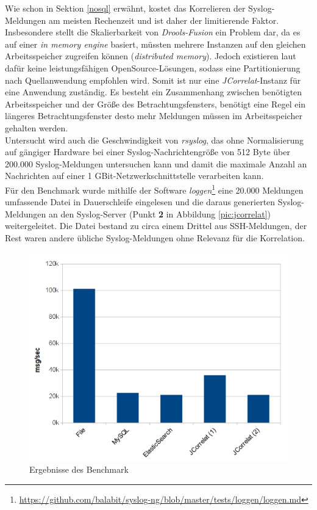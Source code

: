 Wie schon in Sektion \ref{nosql} erwähnt, kostet das Korrelieren der Syslog-Meldungen am 
meisten Rechenzeit und ist daher der limitierende Faktor. Insbesondere stellt die 
Skalierbarkeit von \textit{Drools-Fusion} ein Problem dar, da es auf einer \textit{in 
memory engine} basiert, müssten mehrere Instanzen auf den gleichen Arbeitsspeicher 
zugreifen können (\textit{distributed memory}).
Jedoch existieren laut \cite{reissmann} dafür keine 
leistungsfähigen OpenSource-Lösungen, sodass eine Partitionierung nach Quellanwendung 
empfohlen wird. Somit ist nur eine \textit{JCorrelat}-Instanz für eine Anwendung 
zuständig. Es besteht ein Zusammenhang zwischen benötigten Arbeitsspeicher und der Größe 
des Betrachtungsfensters, benötigt eine Regel ein längeres Betrachtungsfenster desto mehr 
Meldungen müssen im Arbeitsspeicher gehalten werden.\\
Untersucht wird auch die Geschwindigkeit von \textit{rsyslog}, das ohne Normalisierung 
auf gängiger Hardware bei einer Syslog-Nachrichtengröße von 512 Byte über 200.000 
Syslog-Meldungen untersuchen kann und damit die maximale Anzahl an Nachrichten auf einer 
1 GBit-Netzwerkschnittstelle verarbeiten kann.\\

Für den Benchmark wurde mithilfe der Software 
\textit{loggen}\footnote{\url{https://github.com/balabit/syslog-ng/blob/master/tests/loggen/loggen.md}}
 eine 20.000 Meldungen umfassende Datei in Dauerschleife eingelesen und die daraus 
generierten Syslog-Meldungen an den Syslog-Server (Punkt \textbf{2} in Abbildung 
\ref{pic:jcorrelat}) weitergeleitet. Die Datei bestand zu circa einem Drittel aus 
SSH-Meldungen, der Rest waren andere übliche Syslog-Meldungen ohne Relevanz für die 
Korrelation.

\begin{figure}[htbp]
    \caption{Ergebnisse des Benchmark}
    \label{pic:benchmark}\vspace{0.2cm}
    \centering
    \includegraphics[scale=0.46]{img/benchmark}  
\end{figure}

